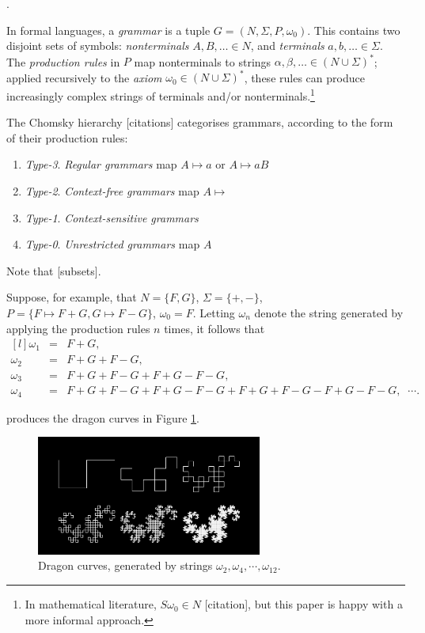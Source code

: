 \documentclass[a4paper, 11pt]{article}
\begin{document}
\begin{flushleft}
. 

\vspace{5pt}\noindent
In formal languages, a \textit{grammar} is a tuple $G = (N,\Sigma,P,\omega_0)$. This contains two disjoint sets of symbols: \textit{nonterminals} $A, B, \dots \in N$, and \textit{terminals} $a, b, \dots \in \Sigma$. The \textit{production rules} in $P$ map nonterminals to strings $\alpha, \beta, \dots \in (N\cup\Sigma)^*$; applied recursively to the \textit{axiom} $\omega_0 \in (N\cup\Sigma)^*$, these rules can produce increasingly complex strings of terminals and/or nonterminals.\footnote{In mathematical literature, $S
\omega_0 \in N$ [citation], but this paper is happy with a more informal approach.}

\vspace{5pt}\noindent
The Chomsky hierarchy [citations] categorises grammars, according to the form of their production rules:
\begin{enumerate}[label=]
\item \textit{Type-3}. \textit{Regular grammars} map $A \mapsto a$ or $A \mapsto aB$
\item \textit{Type-2}. \textit{Context-free grammars} map $A \mapsto $
\item \textit{Type-1}. \textit{Context-sensitive grammars}
\item \textit{Type-0}. \textit{Unrestricted grammars} map $A$
\end{enumerate}
Note that [subsets].

\vspace{5pt}\noindent
Suppose, for example, that $N = \{F, G\}$, $\Sigma = \{+, -\}$, $P = \{F \mapsto F+G, G \mapsto F-G\}$, $\omega_0 = F$.
Letting $\omega_n$ denote the string generated by applying the production rules $n$ times, it follows that
$$\begin{matrix*}[l]
\omega_1 &= &F+G, \\
\omega_2 &= &F+G+F-G, \\
\omega_3 &= &F+G+F-G+F+G-F-G, \\
\omega_4 &= &F+G+F-G+F+G-F-G+F+G+F-G-F+G-F-G, \;\; \cdots.
\end{matrix*}$$

\vspace{5pt} produces the dragon curves in Figure \ref{Dragon Curves}.

\begin{figure}[h]
\centering
\includegraphics[width=0.66\textwidth]{Dragon Curves}
\caption{Dragon curves, generated by strings $\omega_2, \omega_4, \cdots, \omega_{12}$.}
\label{Dragon Curves}
\end{figure}


\end{flushleft}
\end{document}
